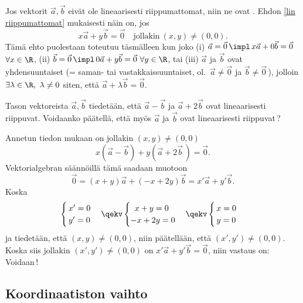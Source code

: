 Jos vektorit $\vec a,\vec b$ eivät ole lineaarisesti riippumattomat, niin ne ovat
%
. Ehdon  \eqref{lin riippumattomat} mukaisesti näin on, jos
\[
x\vec a + y\vec b=\vec 0 \quad \text{jollakin}\ (x,y) \neq (0,0).
\]
Tämä ehto puolestaan toteutuu täsmälleen kun joko
(i) $\vec a = \vec 0 \,\impl\, x\vec a+0\vec b=\vec 0$ $\forall x\in\R$,
(ii) $\vec b = \vec 0 \,\impl\, 0\vec a+y\vec b=\vec 0\ \forall y\in\R$, tai
(iii) $\vec a$ ja $\vec b$ ovat yhdensuuntaiset (= saman- tai vastakkaissuuntaiset, ol.\
$\vec a \neq \vec 0$ ja $\vec b \neq \vec 0\,$), jolloin 
$\exists\lambda\in\R,\ \lambda \neq 0$ siten, että $\vec a + \lambda\vec b = \vec 0$. 
\begin{Exa} Tason vektoreista $\vec a, \vec b$ tiedetään, että $\vec a-\vec b$ ja 
$\vec a+2\vec b$ ovat lineaarisesti riippuvat. Voidaanko päätellä, että myös $\vec a$ ja 
$\vec b$ ovat lineaarisesti riippuvat\,? \end{Exa}
\ratk Annetun tiedon mukaan on jollakin $(x,y) \neq (0,0)$
\[
x(\vec a-\vec b)+y(\vec a+2\vec b\,)=\vec 0.
\]
Vektorialgebran säännöillä tämä saadaan muotoon
\[
\vec 0 = (x+y)\vec a+(-x+2y)\vec b = x'\vec a+y'\vec b.
\]
Koska
\[
\begin{cases} \,x' = 0 \\ \,y' = 0 \end{cases} \qekv \begin{cases} \,\ x+y = 0 \\ -x+2y = 0 
\end{cases} \qekv \begin{cases} \,x =0 \\ \,y = 0 \end{cases}
\]
ja tiedetään, että $(x,y) \neq (0,0)$, niin päätellään, että $(x',y') \neq (0,0)$. Koska siis
jollakin $(x',y') \neq (0,0)$ on $x'\vec a+y'\vec b=\vec 0$, niin vastaus on: Voidaan\,! \loppu

\subsection*{Koordinaatiston vaihto}
%


